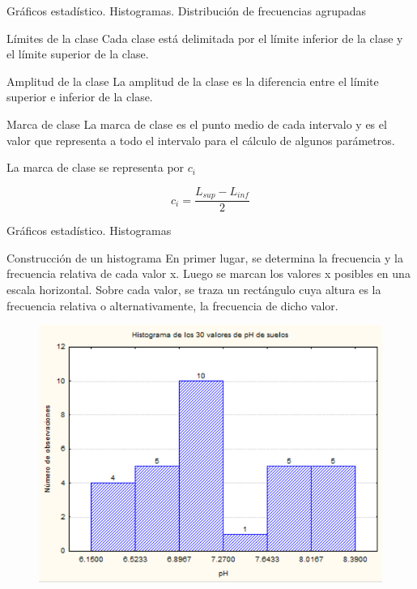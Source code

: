 \documentclass[11pt]{beamer}
\begin{document}
      \begin{frame}{Gráficos estadístico. Histogramas. Distribución de frecuencias agrupadas}

          \begin{block}{Límites de la clase}
              Cada clase está delimitada por el límite inferior de la clase y el límite superior de la clase.
          \end{block}
          \begin{block}{Amplitud de la clase}
              La amplitud de la clase es la diferencia entre el límite superior e inferior de la clase.
          \end{block}
          \begin{block}{Marca de clase}
              La marca de clase es el punto medio de cada intervalo y es el valor que representa a todo el intervalo para el cálculo de algunos parámetros.

              La marca de clase se representa por $c_i$

              $$c_i = \dfrac{L_{sup} - L_{inf}}{2} $$
          \end{block}
      \end{frame}


      \begin{frame}{Gráficos estadístico. Histogramas}
        \pause
        \begin{block}{Construcción de un histograma}
          En primer lugar, se determina la frecuencia y la frecuencia relativa de cada valor x.
Luego se marcan los valores x posibles en una escala horizontal. Sobre cada valor, se
traza un rectángulo cuya altura es la frecuencia relativa o alternativamente, la frecuencia de dicho valor.
        \end{block}
        \begin{figure}
            \centering
            \includegraphics[width=0.5\linewidth]{images/histograma}

            \label{fig:histograma}
        \end{figure}
      \end{frame}
\end{document}
